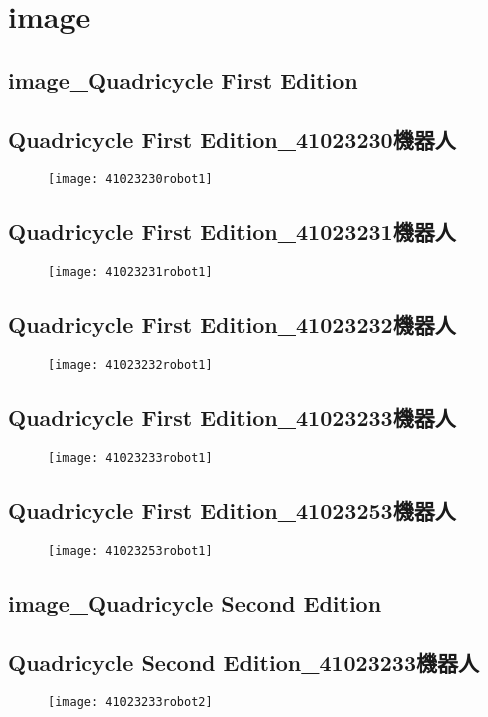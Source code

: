 ﻿\chapter{image}



\section{image\_Quadricycle First Edition}
\section{Quadricycle First Edition\_41023230機器人}
\begin{figure}
\texttt{[image: 41023230robot1]}
\end{figure}
\section{Quadricycle First Edition\_41023231機器人}
\begin{figure}
\texttt{[image: 41023231robot1]}
\end{figure}
\section{Quadricycle First Edition\_41023232機器人}
\begin{figure}
\texttt{[image: 41023232robot1]}
\end{figure}
\section{Quadricycle First Edition\_41023233機器人}
\begin{figure}
\texttt{[image: 41023233robot1]}
\end{figure}
\section{Quadricycle First Edition\_41023253機器人}
\begin{figure}
\texttt{[image: 41023253robot1]}
\end{figure}
\section{image\_Quadricycle Second Edition}
\section{Quadricycle Second Edition\_41023233機器人}
\begin{figure}
\texttt{[image: 41023233robot2]}
\end{figure}
